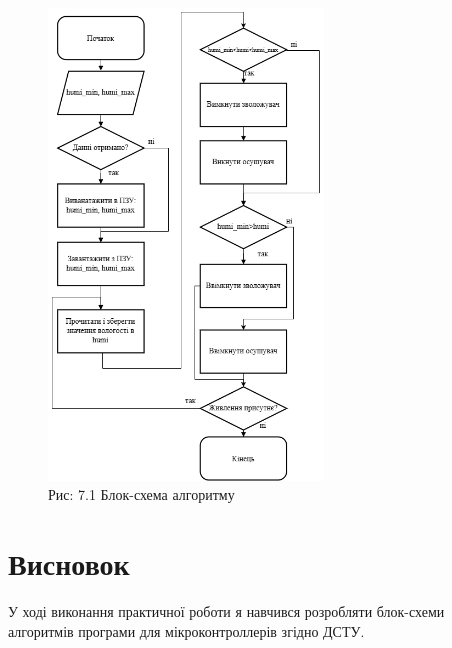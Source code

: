 \documentclass[a4paper]{article}
\begin{document}
\begin{figure}[h]
    \centering
    \includegraphics[width=0.65\textwidth]{imgs/PW7.png}
    \caption*{Рис: 7.1 Блок-схема алгоритму }
\end{figure}



\section*{Висновок}
У ході виконання практичної роботи я навчився  розробляти блок-схеми алгоритмів програми для мікроконтроллерів згідно ДСТУ.
\end{document}
